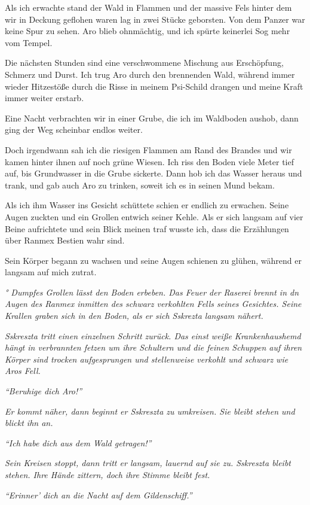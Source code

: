 \documentclass[11pt]{scrartcl}
\begin{document}
Als ich erwachte stand der Wald in Flammen und der massive Fels hinter
dem wir in Deckung geflohen waren lag in zwei Stücke geborsten. Von dem
Panzer war keine Spur zu sehen. Aro blieb ohnmächtig, und ich spürte
keinerlei Sog mehr vom Tempel.

Die nächsten Stunden sind eine verschwommene Mischung aus Erschöpfung,
Schmerz und Durst. Ich trug Aro durch den brennenden Wald, während immer
wieder Hitzestöße durch die Risse in meinem Psi-Schild drangen und meine
Kraft immer weiter erstarb.

Eine Nacht verbrachten wir in einer Grube, die ich im Waldboden aushob,
dann ging der Weg scheinbar endlos weiter.

Doch irgendwann sah ich die riesigen Flammen am Rand des Brandes und wir
kamen hinter ihnen auf noch grüne Wiesen. Ich riss den Boden viele Meter
tief auf, bis Grundwasser in die Grube sickerte. Dann hob ich das Wasser
heraus und trank, und gab auch Aro zu trinken, soweit ich es in seinen
Mund bekam.

Als ich ihm Wasser ins Gesicht schüttete schien er endlich zu erwachen.
Seine Augen zuckten und ein Grollen entwich seiner Kehle. Als er sich
langsam auf vier Beine aufrichtete und sein Blick meinen traf wusste
ich, dass die Erzählungen über Ranmex Bestien wahr sind.

Sein Körper begann zu wachsen und seine Augen schienen zu glühen,
während er langsam auf mich zutrat.

\emph{° Dumpfes Grollen lässt den Boden erbeben. Das Feuer der Raserei
brennt in dn Augen des Ranmex inmitten des schwarz verkohlten Fells
seines Gesichtes. Seine Krallen graben sich in den Boden, als er sich
Sskrezta langsam nähert.}

\emph{Sskreszta tritt einen einzelnen Schritt zurück. Das einst weiße
Krankenhaushemd hängt in verbrannten fetzen um ihre Schultern und die
feinen Schuppen auf ihren Körper sind trocken aufgesprungen und
stellenweise verkohlt und schwarz wie Aros Fell.}

\emph{``Beruhige dich Aro!''}

\emph{Er kommt näher, dann beginnt er Sskreszta zu umkreisen. Sie bleibt
stehen und blickt ihn an.}

\emph{``Ich habe dich aus dem Wald getragen!''}

\emph{Sein Kreisen stoppt, dann tritt er langsam, lauernd auf sie zu.
Sskreszta bleibt stehen. Ihre Hände zittern, doch ihre Stimme bleibt
fest.}

\emph{``Erinner' dich an die Nacht auf dem Gildenschiff.''}
\end{document}
